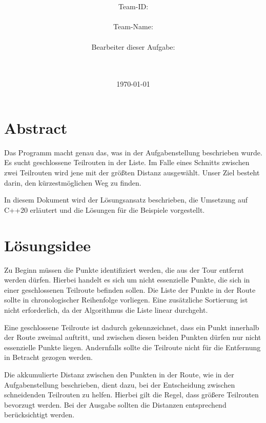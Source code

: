 \documentclass[a4paper,10pt,ngerman]{scrartcl}
\title{\textbf{\Huge\Aufgabe}}
\author{\LARGE Team-ID: \LARGE \TeamId \\\\
	    \LARGE Team-Name: \LARGE \TeamName \\\\
	    \LARGE Bearbeiter dieser Aufgabe: \\ 
	    \LARGE \Namen\\\\}
\date{\LARGE\today}
\begin{document}
\maketitle
\tableofcontents

\vspace{0.5cm}

\section{Abstract}


Das Programm macht genau das, was in der Aufgabenstellung beschrieben wurde. Es sucht geschlossene Teilrouten in der Liste. Im Falle eines Schnitts zwischen zwei Teilrouten wird jene mit der größten Distanz ausgewählt. Unser Ziel besteht darin, den kürzestmöglichen Weg zu finden.

In diesem Dokument wird der Lösungsansatz beschrieben, die Umsetzung auf C++20 erläutert und die Lösungen für die Beispiele vorgestellt.

\section{Lösungsidee}

Zu Beginn müssen die Punkte identifiziert werden, die aus der Tour entfernt werden dürfen. Hierbei handelt es sich um nicht essenzielle Punkte, die sich in einer geschlossenen Teilroute befinden sollen. Die Liste der Punkte in der Route sollte in chronologischer Reihenfolge vorliegen. Eine zusätzliche Sortierung ist nicht erforderlich, da der Algorithmus die Liste linear durchgeht.

Eine geschlossene Teilroute ist dadurch gekennzeichnet, dass ein Punkt innerhalb der Route zweimal auftritt, und zwischen diesen beiden Punkten dürfen nur nicht essenzielle Punkte liegen. Andernfalls sollte die Teilroute nicht für die Entfernung in Betracht gezogen werden.

Die akkumulierte Distanz zwischen den Punkten in der Route, wie in der Aufgabenstellung beschrieben, dient dazu, bei der Entscheidung zwischen schneidenden Teilrouten zu helfen. Hierbei gilt die Regel, dass größere Teilrouten bevorzugt werden. Bei der Ausgabe sollten die Distanzen entsprechend berücksichtigt werden.
\end{document}
